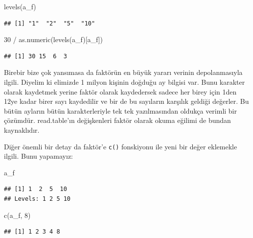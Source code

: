 \documentclass[
]{book}
\newenvironment{Shaded}{\begin{snugshade}}{\end{snugshade}}
\newcommand{\DecValTok}[1]{\textcolor[rgb]{0.00,0.00,0.81}{#1}}
\newcommand{\FunctionTok}[1]{\textcolor[rgb]{0.00,0.00,0.00}{#1}}
\newcommand{\NormalTok}[1]{#1}
\newcommand{\SpecialCharTok}[1]{\textcolor[rgb]{0.00,0.00,0.00}{#1}}
\begin{document}
\begin{Shaded}
\begin{Highlighting}[]
\FunctionTok{levels}\NormalTok{(a\_f)}
\end{Highlighting}
\end{Shaded}

\begin{verbatim}
## [1] "1"  "2"  "5"  "10"
\end{verbatim}

\begin{Shaded}
\begin{Highlighting}[]
\DecValTok{30} \SpecialCharTok{/} \FunctionTok{as.numeric}\NormalTok{(}\FunctionTok{levels}\NormalTok{(a\_f)[a\_f])}
\end{Highlighting}
\end{Shaded}

\begin{verbatim}
## [1] 30 15  6  3
\end{verbatim}

Birebir bize çok yansımasa da faktörün en büyük yararı verinin depolanmasıyla ilgili. Diyelim ki elimizde 1 milyon kişinin doğduğu ay bilgisi var. Bunu karakter olarak kaydetmek yerine faktör olarak kaydedersek sadece her birey için 1den 12ye kadar birer sayı kaydedilir ve bir de bu sayıların karşılık geldiği değerler. Bu bütün ayların bütün karakterleriyle tek tek yazılmasından oldukça verimli bir çözümdür. read.table'ın değişkenleri faktör olarak okuma eğilimi de bundan kaynaklıdır.

Diğer önemli bir detay da faktör'e \texttt{c()} fonskiyonu ile yeni bir değer eklemekle ilgili. Bunu yapamayız:

\begin{Shaded}
\begin{Highlighting}[]
\NormalTok{a\_f}
\end{Highlighting}
\end{Shaded}

\begin{verbatim}
## [1] 1  2  5  10
## Levels: 1 2 5 10
\end{verbatim}

\begin{Shaded}
\begin{Highlighting}[]
\FunctionTok{c}\NormalTok{(a\_f, }\DecValTok{8}\NormalTok{)}
\end{Highlighting}
\end{Shaded}

\begin{verbatim}
## [1] 1 2 3 4 8
\end{verbatim}
\end{document}
